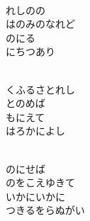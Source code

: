 \documentclass[10pt,b5j]{tarticle} %
\begin{document}
\vspace{1.5em} %
\newcommand{\linespace}{0.5em} %
\newcommand{\blocksize}{0.5\hsize} %
\newcommand{\itemmargin}{3em} %
\begin{enumerate} %
    \setlength{\itemindent}{\itemmargin} %
    \begin{minipage}[c]{\blocksize}
    
        \vspace{\linespace}
        \item~\\
        れしのの\\
        はのみのなれど\\
        のにる\\
        にちつあり
        
    \end{minipage}
    \begin{minipage}[c]{\blocksize}
        
        \vspace{\linespace}
        \item~\\
        くふるさとれし\\
        とのめば\\
        もにえて\\
        はろかによし
        
    \end{minipage}
    \begin{minipage}[c]{\blocksize}
        
        \vspace{\linespace}
        \item~\\
        のにせば\\
        のをこえゆきて\\
        いかにいかに\\
        つきるをらぬがい
        

\end{minipage}
\end{enumerate}
\end{document}
